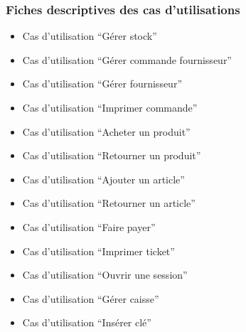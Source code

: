 \documentclass[a4paper,table]{article}
\begin{document}
\newpage

\subsubsection{Fiches descriptives des cas d'utilisations}
\begin{itemize}[font=\color{magenta} \Large, label=]
\item Cas d'utilisation ``Gérer stock''

\newpage

\item Cas d'utilisation ``Gérer commande fournisseur''

\newpage

\item Cas d'utilisation ``Gérer fournisseur''

\newpage

\item Cas d'utilisation ``Imprimer commande''

\newpage

\item Cas d'utilisation ``Acheter un produit''

\newpage

\item Cas d'utilisation ``Retourner un produit''

\newpage

\item Cas d'utilisation ``Ajouter un article''

\newpage

\item Cas d'utilisation ``Retourner un article''

\newpage

\item Cas d'utilisation ``Faire payer''

\newpage

\item Cas d'utilisation ``Imprimer ticket''

\newpage

\item Cas d'utilisation ``Ouvrir une session''

\newpage

\item Cas d'utilisation ``Gérer caisse''

\newpage

\item Cas d'utilisation ``Insérer clé''

\newpage
\end{itemize}
\end{document}
